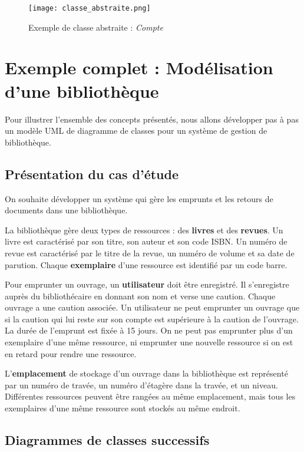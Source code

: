 \documentclass{article}
\begin{document}
\begin{figure}[h]
    \centering
    \texttt{[image: classe\_abstraite.png]}
    \caption{Exemple de classe abstraite : \textit{Compte}}
    \label{fig:classe_abstraite}
\end{figure}


\section{Exemple complet : Modélisation d'une bibliothèque}

Pour illustrer l'ensemble des concepts présentés, nous allons développer pas à pas un modèle UML de diagramme de classes pour un système de gestion de bibliothèque.

\subsection{Présentation du cas d'étude}
On souhaite développer un système qui gère les emprunts et les retours de documents dans une bibliothèque.

La bibliothèque gère deux types de ressources : des \textbf{livres} et des \textbf{revues}. Un livre est caractérisé par son titre, son auteur et son code ISBN. Un numéro de revue est caractérisé par le titre de la revue, un numéro de volume et sa date de parution.  Chaque \textbf{exemplaire} d'une ressource est identifié par un code barre.

Pour emprunter un ouvrage, un \textbf{utilisateur} doit être enregistré.  Il s'enregistre auprès du bibliothécaire en donnant son nom et verse une caution.  Chaque ouvrage a une caution associée. Un utilisateur ne peut emprunter un ouvrage que si la caution qui lui reste sur son compte est supérieure à la caution de l'ouvrage. La durée de l'emprunt est fixée à 15 jours.  On ne peut pas emprunter plus d'un exemplaire d'une même ressource, ni emprunter une nouvelle ressource si on est en retard pour rendre une ressource.

L'\textbf{emplacement} de stockage d'un ouvrage dans la bibliothèque est représenté par un numéro de travée, un numéro d'étagère dans la travée, et un niveau. Différentes ressources peuvent être rangées au même emplacement, mais tous les exemplaires d'une même ressource sont stockés au même endroit.

\subsection{Diagrammes de classes successifs}
\end{document}
